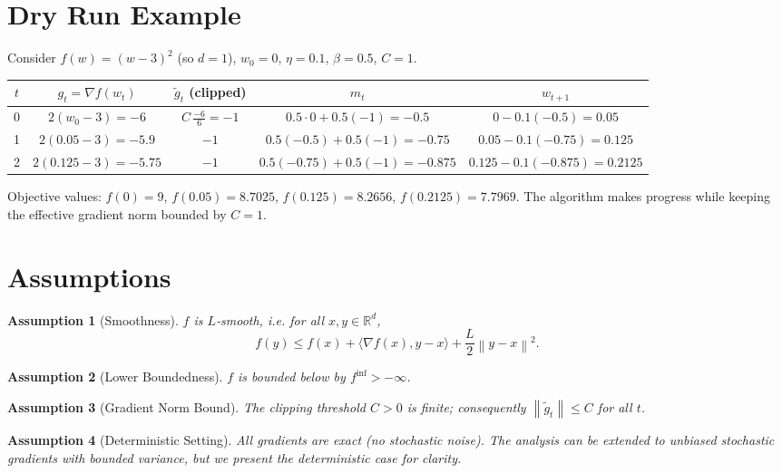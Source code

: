 \documentclass{article}
\newtheorem{assumption}{Assumption}
\newcommand{\norm}[1]{\left\lVert#1\right\rVert}
\newcommand{\grad}{\nabla}
\begin{document}
\section*{Dry Run Example}
Consider $f(w)=(w-3)^2$ (so $d=1$), $w_0=0$, $\eta=0.1$, $\beta=0.5$, $C=1$.

\begin{center}
\begin{tabular}{c|c|c|c|c}
$t$ & $g_t=\grad f(w_t)$ & $\tilde g_t$ (clipped) & $m_t$ & $w_{t+1}$ \\ \hline
0 & $2(w_0-3)=-6$ & $C\,\frac{-6}{6}=-1$ & $0.5\cdot0+0.5(-1)=-0.5$ & $0-0.1(-0.5)=0.05$ \\ \hline
1 & $2(0.05-3)=-5.9$ & $-1$ & $0.5(-0.5)+0.5(-1)=-0.75$ & $0.05-0.1(-0.75)=0.125$ \\ \hline
2 & $2(0.125-3)=-5.75$ & $-1$ & $0.5(-0.75)+0.5(-1)=-0.875$ & $0.125-0.1(-0.875)=0.2125$
\end{tabular}
\end{center}
Objective values: $f(0)=9$, $f(0.05)=8.7025$, $f(0.125)=8.2656$, $f(0.2125)=7.7969$.
The algorithm makes progress while keeping the effective gradient norm bounded by $C=1$.

\newpage
\section*{Assumptions}
\begin{assumption}[Smoothness]\label{ass:smooth}
$f$ is $L$‑smooth, i.e. for all $x,y\in\mathbb{R}^d$,
\[
    f(y)\le f(x)+\langle \grad f(x),y-x\rangle+\frac{L}{2}\norm{y-x}^2 .
\]
\end{assumption}
\begin{assumption}[Lower Boundedness]\label{ass:lb}
$f$ is bounded below by $f^{\inf}>-\infty$.
\end{assumption}
\begin{assumption}[Gradient Norm Bound]\label{ass:clip}
The clipping threshold $C>0$ is finite; consequently $\norm{\tilde g_t}\le C$ for all $t$.
\end{assumption}
\begin{assumption}[Deterministic Setting]\label{ass:det}
All gradients are exact (no stochastic noise). The analysis can be extended to unbiased stochastic gradients with bounded variance, but we present the deterministic case for clarity.
\end{assumption}
\end{document}
